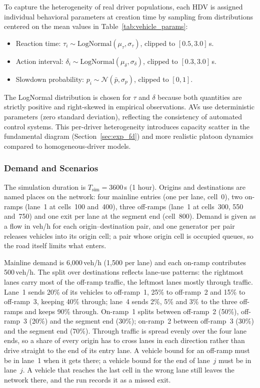 \documentclass[review,number]{elsarticle}
\begin{document}
To capture the heterogeneity of real driver populations, each HDV is assigned individual behavioral parameters at creation time by sampling from distributions centered on the mean values in Table~\ref{tab:vehicle_params}:
\begin{itemize}
    \item Reaction time: $\tau_i \sim \text{LogNormal}(\mu_\tau, \sigma_\tau)$, clipped to $[0.5, 3.0]$\,s.
    \item Action interval: $\delta_i \sim \text{LogNormal}(\mu_\delta, \sigma_\delta)$, clipped to $[0.3, 3.0]$\,s.
    \item Slowdown probability: $p_i \sim \mathcal{N}(\bar{p}, \sigma_p)$, clipped to $[0, 1]$.
\end{itemize}
The LogNormal distribution is chosen for $\tau$ and $\delta$ because both quantities are strictly positive and right-skewed in empirical observations. AVs use deterministic parameters (zero standard deviation), reflecting the consistency of automated control systems. This per-driver heterogeneity introduces capacity scatter in the fundamental diagram (Section~\ref{sec:exp_fd}) and more realistic platoon dynamics compared to homogeneous-driver models.

\subsubsection{Demand and Scenarios}
\label{sec:demand}

The simulation duration is $T_{\text{sim}} = 3600$\,s (1 hour). Origins and destinations are named places on the network: four mainline entries (one per lane, cell~0), two on-ramps (lane~1 at cells~100 and~400), three off-ramps (lane~1 at cells~300, 550 and~750) and one exit per lane at the segment end (cell~800). Demand is given as a flow in veh/h for each origin--destination pair, and one generator per pair releases vehicles into its origin cell; a pair whose origin cell is occupied queues, so the road itself limits what enters.

Mainline demand is 6{,}000\,veh/h (1{,}500 per lane) and each on-ramp contributes 500\,veh/h. The split over destinations reflects lane-use patterns: the rightmost lanes carry most of the off-ramp traffic, the leftmost lanes mostly through traffic. Lane~1 sends 20\% of its vehicles to off-ramp~1, 25\% to off-ramp~2 and 15\% to off-ramp~3, keeping 40\% through; lane~4 sends 2\%, 5\% and 3\% to the three off-ramps and keeps 90\% through. On-ramp~1 splits between off-ramp~2 (50\%), off-ramp~3 (20\%) and the segment end (30\%); on-ramp~2 between off-ramp~3 (30\%) and the segment end (70\%). Through traffic is spread evenly over the four lane ends, so a share of every origin has to cross lanes in each direction rather than drive straight to the end of its entry lane. A vehicle bound for an off-ramp must be in lane~1 when it gets there; a vehicle bound for the end of lane~$j$ must be in lane~$j$. A vehicle that reaches the last cell in the wrong lane still leaves the network there, and the run records it as a missed exit.
\end{document}
